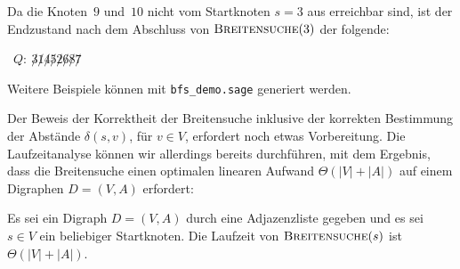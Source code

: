 \begin{bsp}
\condclearpage 
Da die Knoten~$9$ und~$10$ nicht vom Startknoten $s=3$ aus erreichbar sind, ist der Endzustand nach dem Abschluss von $\mathop{\text{\textsc{Breitensuche}}}(3)$ der folgende:

\hfill\, $Q: \ \not 3 \not1 \not4 \not5 \not2 \not6 \not8 \not7$

\condclearpage 
Weitere Beispiele können mit \verb#bfs_demo.sage# generiert werden.
\end{bsp}

\begin{bem}
Der Beweis der Korrektheit der Breitensuche inklusive der korrekten Bestimmung der Abstände $\delta(s,v)$, für $v \in V$, erfordert noch etwas Vorbereitung.
Die Laufzeitanalyse können wir allerdings bereits durchführen, mit dem Ergebnis, dass die Breitensuche einen optimalen linearen Aufwand $\Theta(|V|+|A|)$ auf einem Digraphen $D  = (V,A)$ erfordert:
\end{bem}

\begin{thm}
\label{thm:laufzeit-breitensuche}
Es sei ein Digraph $D=(V,A)$ durch eine Adjazenzliste gegeben und es sei $s \in V$ ein beliebiger Startknoten.
Die Laufzeit von $\mathop{\text{\textsc{Breitensuche}}}(s)$ ist $\Theta(|V|+|A|)$.
\end{thm}

